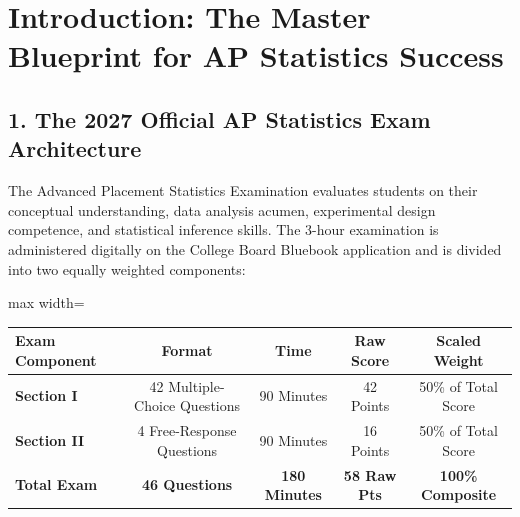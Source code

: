 \chapter*{Introduction: The Master Blueprint for AP Statistics Success}

\section*{1. The 2027 Official AP Statistics Exam Architecture}
The Advanced Placement Statistics Examination evaluates students on their conceptual understanding, data analysis acumen, experimental design competence, and statistical inference skills. The 3-hour examination is administered digitally on the College Board Bluebook application and is divided into two equally weighted components:

\begin{center}
\begin{adjustbox}{max width=\linewidth}
\begin{tabular}{lcccc}
\toprule
\textbf{Exam Component} & \textbf{Format} & \textbf{Time} & \textbf{Raw Score} & \textbf{Scaled Weight} \\
\midrule
\textbf{Section I} & 42 Multiple-Choice Questions & 90 Minutes & 42 Points & 50\% of Total Score \\
\textbf{Section II} & 4 Free-Response Questions & 90 Minutes & 16 Points & 50\% of Total Score \\
\midrule
\textbf{Total Exam} & \textbf{46 Questions} & \textbf{180 Minutes} & \textbf{58 Raw Pts} & \textbf{100\% Composite} \\
\bottomrule
\end{tabular}
\end{adjustbox}
\end{center}

